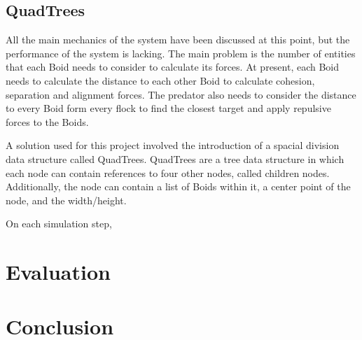 \documentclass{egpubl}
\begin{document}
\subsection{QuadTrees}
\label{qtree}
All the main mechanics of the system have been discussed at this point, but the performance of the system is lacking. The main problem is the number of entities that each Boid needs to consider to calculate its forces.  At present, each Boid needs to calculate the distance to each other Boid to calculate cohesion, separation and alignment forces. The predator also needs to consider the distance to every Boid form every flock to find the closest target and apply repulsive forces to the Boids.
\par
A solution used for this project involved the introduction of a spacial division data structure called QuadTrees. QuadTrees are a tree data structure in which each node can contain references to four other nodes, called children nodes. Additionally, the node can contain a list of Boids within it, a center point of the node, and the width/height.
\par
On each simulation step, 
\section{Evaluation}
\section{Conclusion}
\printbibliography                
\end{document}

